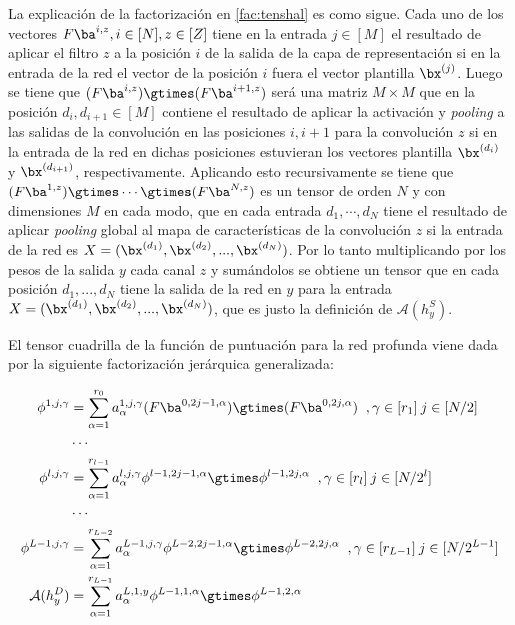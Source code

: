 La explicación de la factorización en \eqref{fac:tenshal} es como sigue. Cada uno de los vectores $F\ba^{i,z}, i\in[N], z\in[Z]$ tiene en la entrada $j\in [M]$ el resultado de aplicar el filtro $z$ a la posición $i$ de la salida de la capa de representación si en la entrada de la red el vector de la posición $i$ fuera el vector plantilla $\bx^{(j)}$. Luego se tiene que $(F\ba^{i,z})\gtimes(F\ba^{i+1,z})$ será una matriz $M\times M$ que en la posición $d_i,d_{i+1}\in [M]$ contiene el resultado de aplicar la activación y \textit{pooling} a las salidas de la convolución en las posiciones $i,i+1$ para la convolución $z$ si en la entrada de la red en dichas posiciones estuvieran los vectores plantilla $\bx^{(d_i)}$ y $\bx^{(d_{i+1})}$, respectivamente. Aplicando esto recursivamente se tiene que $(F\ba^{1,z})\gtimes\cdots \gtimes(F\ba^{N,z})$ es un tensor de orden $N$ y con dimensiones $M$ en cada modo, que en cada entrada $d_1,\cdots ,d_N$ tiene el resultado de aplicar \textit{pooling} global al mapa de características de la convolución $z$ si la entrada de la red es $X=(\bx^{(d_1)},\bx^{(d_2)},... ,\bx^{(d_N)})$. Por lo tanto multiplicando por los pesos de la salida $y$ cada canal $z$ y sumándolos se obtiene un tensor que en cada posición $d_1,... ,d_N$ tiene la salida de la red en $y$ para la entrada $X=(\bx^{(d_1)},\bx^{(d_2)},... ,\bx^{(d_N)})$, que es justo la definición de $\mathcal{A}(h_y^S)$.

El tensor cuadrilla de la función de puntuación para la red profunda viene dada por la siguiente factorización jerárquica generalizada:

\begin{equation} \label{fac:tendeep}
\begin{aligned}
\phi^{1,j,\gamma} &= \sum^{r_0}_{\alpha=1}a_\alpha^{1,j,\gamma}(F\ba^{0,2j-1,\alpha})\gtimes(F\ba^{0,2j,\alpha}) \;\; ,\gamma \in [r_1] \:  j \in [N/2] \\
&\cdots  \\
\phi^{l,j,\gamma} &= \sum^{r_{l-1}}_{\alpha=1}a_\alpha^{l,j,\gamma}\phi^{l-1,2j-1,\alpha}\gtimes\phi^{l-1,2j,\alpha} \;\; ,\gamma \in [r_l] \: j \in [N/2^l] \\
&\cdots  \\
\phi^{L-1,j,\gamma} &= \sum^{r_{L-2}}_{\alpha=1}a_\alpha^{L-1,j,\gamma}\phi^{L-2,2j-1,\alpha}\gtimes\phi^{L-2,2j,\alpha} \;\; ,\gamma \in [r_{L-1}] \: j \in [N/2^{L-1}] \\
\mathcal{A}(h_y^D) &= \sum^{r_{L-1}}_{\alpha=1}a_\alpha^{L,1,y}\phi^{L-1,1,\alpha}\gtimes\phi^{L-1,2,\alpha}\\
\end{aligned}
\end{equation}


